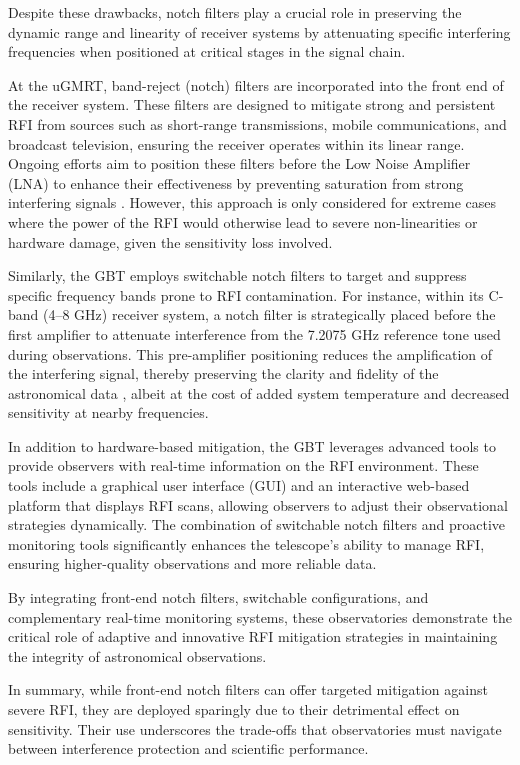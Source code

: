 Despite these drawbacks, notch filters play a crucial role in preserving the dynamic range and linearity of receiver systems by attenuating specific interfering frequencies when positioned at critical stages in the signal chain. 

At the uGMRT, band-reject (notch) filters are incorporated into the front end of the receiver system. These filters are designed to mitigate strong and persistent RFI from sources such as short-range transmissions, mobile communications, and broadcast television, ensuring the receiver operates within its linear range. Ongoing efforts aim to position these filters before the Low Noise Amplifier (LNA) to enhance their effectiveness by preventing saturation from strong interfering signals \citep{sureshkumar2016rfi}. However, this approach is only considered for extreme cases where the power of the RFI would otherwise lead to severe non-linearities or hardware damage, given the sensitivity loss involved.

Similarly, the GBT employs switchable notch filters to target and suppress specific frequency bands prone to RFI contamination. For instance, within its C-band (4–8 GHz) receiver system, a notch filter is strategically placed before the first amplifier to attenuate interference from the 7.2075 GHz reference tone used during observations. This pre-amplifier positioning reduces the amplification of the interfering signal, thereby preserving the clarity and fidelity of the astronomical data \citep{gbt1}, albeit at the cost of added system temperature and decreased sensitivity at nearby frequencies.

In addition to hardware-based mitigation, the GBT leverages advanced tools to provide observers with real-time information on the RFI environment. These tools include a graphical user interface (GUI) and an interactive web-based platform that displays RFI scans, allowing observers to adjust their observational strategies dynamically. The combination of switchable notch filters and proactive monitoring tools significantly enhances the telescope’s ability to manage RFI, ensuring higher-quality observations and more reliable data.

By integrating front-end notch filters, switchable configurations, and complementary real-time monitoring systems, these observatories demonstrate the critical role of adaptive and innovative RFI mitigation strategies in maintaining the integrity of astronomical observations.

In summary, while front-end notch filters can offer targeted mitigation against severe RFI, they are deployed sparingly due to their detrimental effect on sensitivity. Their use underscores the trade-offs that observatories must navigate between interference protection and scientific performance.

